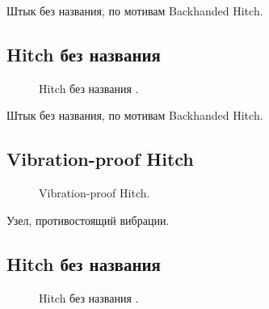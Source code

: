 Штык без названия, по мотивам Backhanded Hitch.

\addtocounter{HitchNoName}{1}

\subsection{Hitch без названия }

\begin{figure}[H]\centering
	\begin{minipage}{1\linewidth}
		\begin{center}
			\tcbox[enhanced jigsaw,colframe=black,opacityframe=0.5,opacityback=0.5]
			{\centering{}}
		\end{center}
	\end{minipage}
\caption{Hitch без названия .}
\label{ris:Backhanded_Hitch_motiv}
\end{figure}

Штык без названия, по мотивам Backhanded Hitch.

\subsection{Vibration-proof Hitch}

\begin{figure}[H]\centering
\hfil
	\caption{Vibration-proof Hitch.}\label{ris:Vibration-proof_Hitch}
\end{figure}

Узел, противостоящий вибрации.

\addtocounter{HitchNoName}{1}

\subsection{Hitch без названия }

\begin{figure}[H]\centering
	\begin{minipage}{1\linewidth}
		\begin{center}
			\tcbox[enhanced jigsaw,colframe=black,opacityframe=0.5,opacityback=0.5]
			{\centering{}}
		\end{center}
	\end{minipage}
\caption{Hitch без названия .}
\label{ris:Hitch_noname_11}
\end{figure}

